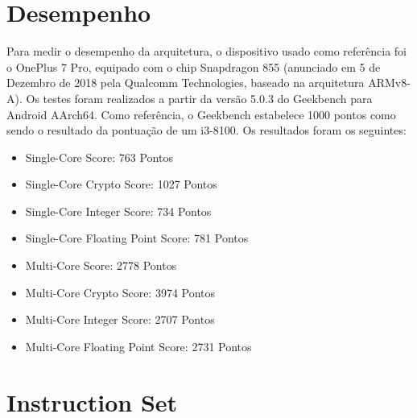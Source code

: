 \documentclass[12pt,a4paper,utf8]{ppgsi}
\begin{document}
\section{Desempenho}
Para medir o desempenho da arquitetura, o dispositivo usado como referência foi o OnePlus 7 Pro, equipado com o chip Snapdragon 855 (anunciado em 5 de Dezembro de 2018 pela Qualcomm Technologies, baseado na arquitetura ARMv8-A). Os testes foram realizados a partir da versão 5.0.3 do Geekbench para Android AArch64. Como referência, o Geekbench estabelece 1000 pontos como sendo o resultado da pontuação de um i3-8100. Os resultados foram os seguintes:
\begin{itemize}
      \item Single-Core Score: 763 Pontos
      \item Single-Core Crypto Score: 1027 Pontos
      \item Single-Core Integer Score: 734 Pontos
      \item Single-Core Floating Point Score: 781 Pontos
      \item Multi-Core Score: 2778 Pontos
      \item Multi-Core Crypto Score: 3974 Pontos
      \item Multi-Core Integer Score: 2707	Pontos
      \item Multi-Core Floating Point Score: 2731 Pontos
      
\end{itemize}

\section{Instruction Set}
\end{document}
